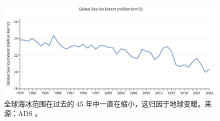 \documentclass[10pt,twocolumn,letterpaper]{article}
\begin{document}
\begin{figure}[t]
\begin{center}
\includegraphics[width=1\textwidth]{ice.jpg}
\end{center}
   \caption{全球海冰范围在过去的 45 年中一直在缩小，这归因于地球变暖。来源：ADS \cite{149}。}
\label{fig:24}
\end{figure}

\clearpage
\twocolumn

{\small
\renewcommand{\refname}{参考文献}


}
\end{document}
